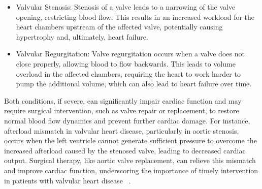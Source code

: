 \begin{itemize}
    \item Valvular Stenosis: Stenosis of a valve leads to a narrowing of the valve opening, restricting blood flow. This results in an increased workload for the heart chambers upstream of the affected valve, potentially causing hypertrophy and, ultimately, heart failure.
    \item Valvular Regurgitation: Valve regurgitation occurs when a valve does not close properly, allowing blood to flow backwards. This leads to volume overload in the affected chambers, requiring the heart to work harder to pump the additional volume, which can also lead to heart failure over time.
\end{itemize}
Both conditions, if severe, can significantly impair cardiac function and may require surgical intervention, such as valve repair or replacement, to restore normal blood flow dynamics and prevent further cardiac damage. For instance, afterload mismatch in valvular heart disease, particularly in aortic stenosis, occurs when the left ventricle cannot generate sufficient pressure to overcome the increased afterload caused by the stenosed valve, leading to decreased cardiac output. Surgical therapy, like aortic valve replacement, can relieve this mismatch and improve cardiac function, underscoring the importance of timely intervention in patients with valvular heart disease ~.


